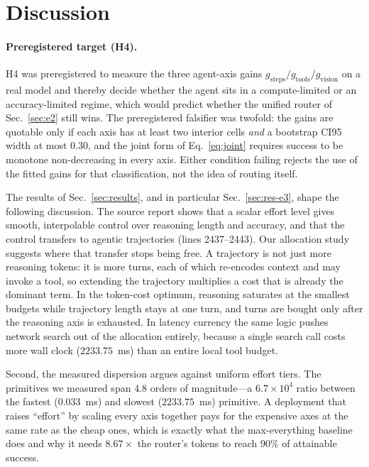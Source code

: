 \documentclass[10pt]{article} %
\begin{document}
\section{Discussion}
\label{sec:discussion}

\paragraph{Preregistered target (H4).} H4 was preregistered to measure the three agent-axis gains
$g_{\mathrm{steps}}/g_{\mathrm{tools}}/g_{\mathrm{vision}}$ on a real model and thereby decide whether
the agent sits in a compute-limited or an accuracy-limited regime, which would predict whether the
unified router of Sec.~\ref{sec:e2} still wins. The preregistered falsifier was twofold: the gains are
quotable only if each axis has at least two interior cells \emph{and} a bootstrap CI95 width
at most $0.30$, and the joint form of Eq.~\eqref{eq:joint} requires success to be monotone
non-decreasing in every axis. Either condition failing rejects the use of the fitted gains for that
classification, not the idea of routing itself.

The results of Sec.~\ref{sec:results}, and in particular Sec.~\ref{sec:res-e3}, shape the following discussion. The source report shows that a scalar effort level gives smooth, interpolable
control over reasoning length and accuracy, and that the control transfers to
agentic trajectories (lines 2437--2443). Our allocation study suggests where that
transfer stops being free. A trajectory is not just more reasoning tokens: it is
more turns, each of which re-encodes context and may invoke a tool, so extending
the trajectory multiplies a cost that is already the dominant term. In the
token-cost optimum, reasoning saturates at the smallest budgets while trajectory
length stays at one turn, and turns are bought only after the reasoning axis is
exhausted. In latency currency the same logic pushes network search out of the
allocation entirely, because a single search call costs more wall clock
($2233.75$~ms) than an entire local tool budget.

Second, the measured dispersion argues against uniform effort tiers. The
primitives we measured span $4.8$ orders of magnitude---a $6.7\times10^{4}$ ratio between
the fastest ($0.033$~ms) and slowest ($2233.75$~ms) primitive. A deployment that raises ``effort'' by scaling every axis
together pays for the expensive axes at the same rate as the cheap ones, which is
exactly what the max-everything baseline does and why it needs $8.67\times$ the
router's tokens to reach $90\%$ of attainable success.
\end{document}
